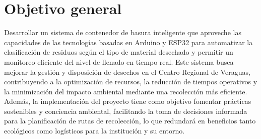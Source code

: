\section{Objetivo general}
Desarrollar un sistema de contenedor de basura inteligente que aproveche las capacidades de las tecnologías basadas en Arduino y ESP32 para automatizar la clasificación de residuos según el tipo de material desechado y permitir un monitoreo eficiente del nivel de llenado en tiempo real. Este sistema busca mejorar la gestión y disposición de desechos en el Centro Regional de Veraguas, contribuyendo a la optimización de recursos, la reducción de tiempos operativos y la minimización del impacto ambiental mediante una recolección más eficiente. Además, la implementación del proyecto tiene como objetivo fomentar prácticas sostenibles y conciencia ambiental, facilitando la toma de decisiones informada para la planificación de rutas de recolección, lo que redundará en beneficios tanto ecológicos como logísticos para la institución y su entorno.